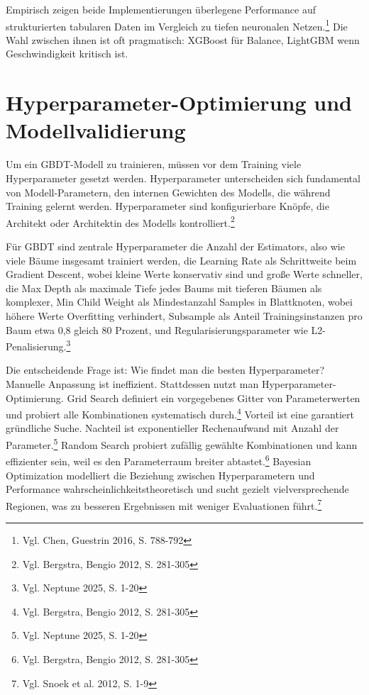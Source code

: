 Empirisch zeigen beide Implementierungen überlegene Performance auf strukturierten tabularen Daten im Vergleich zu tiefen neuronalen Netzen.\footnote{Vgl. Chen, Guestrin 2016, S. 788-792} Die Wahl zwischen ihnen ist oft pragmatisch: XGBoost für Balance, LightGBM wenn Geschwindigkeit kritisch ist.



\section{Hyperparameter-Optimierung und Modellvalidierung}

Um ein GBDT-Modell zu trainieren, müssen vor dem Training viele Hyperparameter gesetzt werden. Hyperparameter unterscheiden sich fundamental von Modell-Parametern, den internen Gewichten des Modells, die während Training gelernt werden. Hyperparameter sind konfigurierbare Knöpfe, die Architekt oder Architektin des Modells kontrolliert.\footnote{Vgl. Bergstra, Bengio 2012, S. 281-305}

Für GBDT sind zentrale Hyperparameter die Anzahl der Estimators, also wie viele Bäume insgesamt trainiert werden, die Learning Rate als Schrittweite beim Gradient Descent, wobei kleine Werte konservativ sind und große Werte schneller, die Max Depth als maximale Tiefe jedes Baums mit tieferen Bäumen als komplexer, Min Child Weight als Mindestanzahl Samples in Blattknoten, wobei höhere Werte Overfitting verhindert, Subsample als Anteil Trainingsinstanzen pro Baum etwa 0,8 gleich 80 Prozent, und Regularisierungsparameter wie L2-Penalisierung.\footnote{Vgl. Neptune 2025, S. 1-20}

Die entscheidende Frage ist: Wie findet man die besten Hyperparameter? Manuelle Anpassung ist ineffizient. Stattdessen nutzt man Hyperparameter-Optimierung. Grid Search definiert ein vorgegebenes Gitter von Parameterwerten und probiert alle Kombinationen systematisch durch.\footnote{Vgl. Bergstra, Bengio 2012, S. 281-305} Vorteil ist eine garantiert gründliche Suche. Nachteil ist exponentieller Rechenaufwand mit Anzahl der Parameter.\footnote{Vgl. Neptune 2025, S. 1-20} Random Search probiert zufällig gewählte Kombinationen und kann effizienter sein, weil es den Parameterraum breiter abtastet.\footnote{Vgl. Bergstra, Bengio 2012, S. 281-305} Bayesian Optimization modelliert die Beziehung zwischen Hyperparametern und Performance wahrscheinlichkeitstheoretisch und sucht gezielt vielversprechende Regionen, was zu besseren Ergebnissen mit weniger Evaluationen führt.\footnote{Vgl. Snoek et al. 2012, S. 1-9}


